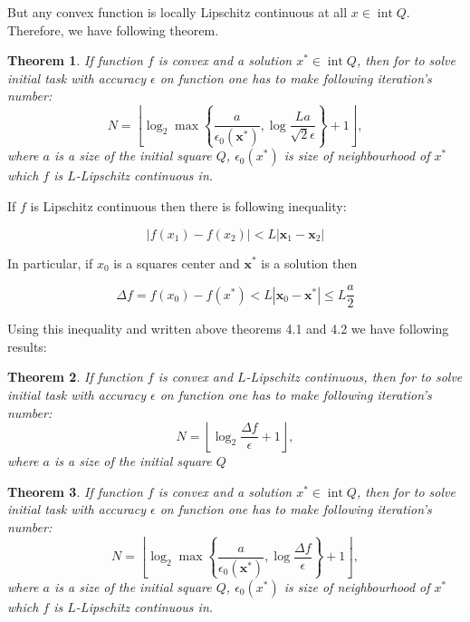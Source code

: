 \documentclass[12pt]{article}
\DeclareMathOperator{\intt}{int}
\newtheorem{theorem}{Theorem}[section]
\begin{document}
But any convex function is locally Lipschitz continuous at all $x \in \intt Q$. Therefore, we have following theorem.

\begin{theorem}
If function $f$ is convex and a solution $x^*\in \intt Q$, then for to solve initial task with accuracy $\epsilon$ on function one has to make following iteration's number:
$$N = \left\lfloor\log_2\max\left\{\frac{a}{\epsilon_0(\textbf{x}^*)},\log\frac{La}{\sqrt{2}\epsilon}\right\}+1\right\rfloor,$$
where $a$ is a size of the initial square $Q$, $\epsilon_0(x^*)$ is size of neighbourhood of $x^*$ which $f$ is $L$-Lipschitz continuous in.
\end{theorem}

If $f$ is Lipschitz continuous then there is following inequality:

$$|f(x_1)-f(x_2)| < L|\textbf{x}_1 - \textbf{x}_2|$$

In particular, if $x_0$ is a squares center and $\textbf{x}^*$ is a solution then 

$$\Delta f = f(x_0) - f(x^*) < L|\textbf{x}_0 - \textbf{x}^*| \leq L\frac{a}{2}$$

Using this inequality and written above theorems 4.1 and 4.2  we have following results:

\begin{theorem}
If function $f$ is convex and $L$-Lipschitz continuous, then for to solve initial task with accuracy $\epsilon$ on function one has to make following iteration's number:
$$N = \left\lfloor\log_2\frac{\Delta f}{\epsilon} + 1\right\rfloor,$$
where $a$ is a size of the initial square $Q$
\end{theorem}

\begin{theorem}
If function $f$ is convex and a solution $x^*\in \intt Q$, then for to solve initial task with accuracy $\epsilon$ on function one has to make following iteration's number:
$$N = \left\lfloor\log_2\max\left\{\frac{a}{\epsilon_0(\textbf{x}^*)},\log\frac{\Delta f}{\epsilon}\right\}+1\right\rfloor,$$
where $a$ is a size of the initial square $Q$, $\epsilon_0(x^*)$ is size of neighbourhood of $x^*$ which $f$ is $L$-Lipschitz continuous in.
\end{theorem}
\end{document}
